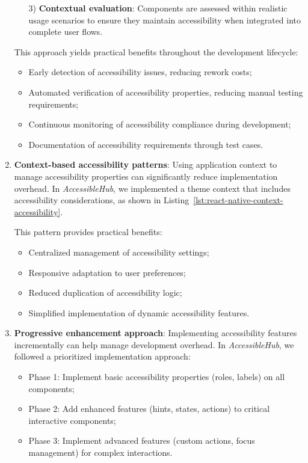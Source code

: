 \begin{enumerate}
\begin{enumerate}
        3) \textbf{Contextual evaluation}: Components are assessed within realistic usage scenarios to ensure they maintain accessibility when integrated into complete user flows.
    \end{enumerate}
    
    This approach yields practical benefits throughout the development lifecycle:
    \begin{itemize}
        \item Early detection of accessibility issues, reducing rework costs;
        \item Automated verification of accessibility properties, reducing manual testing requirements;
        \item Continuous monitoring of accessibility compliance during development;
        \item Documentation of accessibility requirements through test cases.
    \end{itemize}
    
    \item \textbf{Context-based accessibility patterns}: Using application context to manage accessibility properties can significantly reduce implementation overhead. In \textit{AccessibleHub}, we implemented a theme context that includes accessibility considerations, as shown in Listing~\ref{lst:react-native-context-accessibility}.
    
    This pattern provides practical benefits:
    \begin{itemize}
        \item Centralized management of accessibility settings;
        \item Responsive adaptation to user preferences;
        \item Reduced duplication of accessibility logic;
        \item Simplified implementation of dynamic accessibility features.
    \end{itemize}
    
    \item \textbf{Progressive enhancement approach}: Implementing accessibility features incrementally can help manage development overhead. In \textit{AccessibleHub}, we followed a prioritized implementation approach:
    \begin{itemize}
        \item Phase 1: Implement basic accessibility properties (roles, labels) on all components;
        \item Phase 2: Add enhanced features (hints, states, actions) to critical interactive components;
        \item Phase 3: Implement advanced features (custom actions, focus management) for complex interactions.
    \end{itemize}
    

\end{enumerate}
